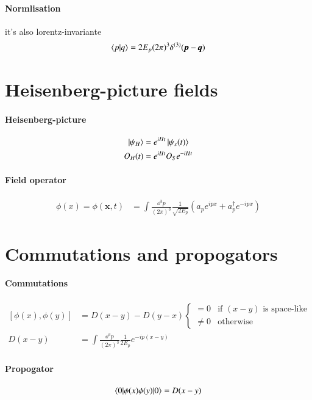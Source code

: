\documentclass{scrartcl}
\numberwithin{equation}{section}
\begin{document}
\paragraph{Normlisation} it's also lorentz-invariante
\begin{align}
	\braket{p|q} = 2E_p (2\pi)^3 \delta^{(3)}(\pmb{p} - \pmb{q})
\end{align}
\section{Heisenberg-picture fields}
\paragraph{Heisenberg-picture}
\begin{align}
	\ket{\psi_H} &= e^{iHt}\ket{\psi_s (t)} \\
	O_H(t) & = e^{iHt}O_S e^{-iHt} 
\end{align}
\paragraph{Field operator}
\begin{align}
	\phi(x) = \phi({\pmb{x},t}) &= \int \frac{\dd^3 p}{(2\pi)^3}\frac{1}{\sqrt{2E_p}} \left( a_p e^{ipx} + a_{p}^\dagger e^{-i p x} \right)
\end{align}

\section{Commutations and propogators}
\paragraph{Commutations}
\begin{align}
	\left[ \phi(x), \phi(y) \right] &= D(x-y) - D(y-x)
	\begin{cases}
		= 0 & \text{if $(x-y)$ is space-like} \\
		\neq 0 & \text{otherwise}
	\end{cases} \\
	D(x-y) &= \int\frac{\dd^3p}{(2\pi)^3} \frac{1}{2E_p} e^{-ip(x-y)}
\end{align}
\paragraph{Propogator}
\begin{align}
	\braket{0 | \phi(x) \phi(y) | 0} = D(x-y)
\end{align}
\end{document}
